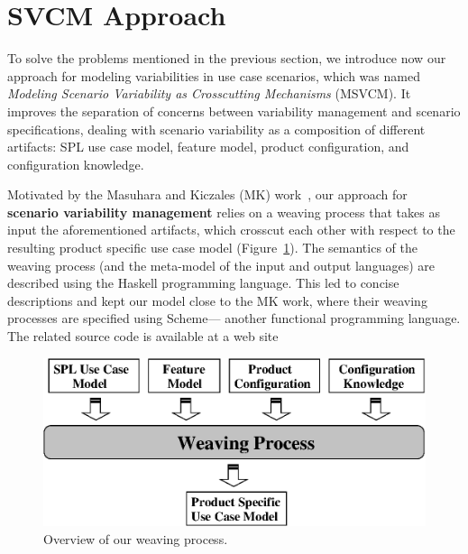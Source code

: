 \section{SVCM Approach}
\label{sec:svmc}

To solve the problems mentioned in the previous section, we introduce now our
approach for modeling variabilities in use case scenarios, which was named
\emph{Modeling Scenario Variability as Crosscutting Mechanisms} (MSVCM). It
improves the separation of concerns between variability management and scenario
specifications, dealing with scenario variability as a composition of different
artifacts: SPL use case model, feature model, product configuration,
and configuration knowledge.

Motivated by the Masuhara and Kiczales (MK) work~\cite{Masuhara:2003aa}, our
approach for \textbf{scenario variability management} relies on a weaving
process that takes as input the aforementioned artifacts, which crosscut
each other with respect to the resulting product specific use case model
(Figure~\ref{fig:weave-process}). The semantics of the weaving process (and the
meta-model of the input and output languages) are described using the Haskell
programming language. This led to concise descriptions and kept our model close
to the MK work, where their weaving processes are specified using Scheme---
another functional programming language. The related source code is available 
at a web site~\cite{SPG:site}

\begin{figure}[htb]
 \begin{center}
  \includegraphics[scale=0.55]{img/weaving-process.eps}
  \caption{Overview of our weaving process.}
  \label{fig:weave-process}
  \end{center}
\end{figure}

